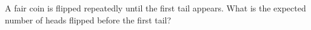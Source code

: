 A fair coin is flipped repeatedly until the first tail appears. What is the expected number of heads flipped before the first tail?
